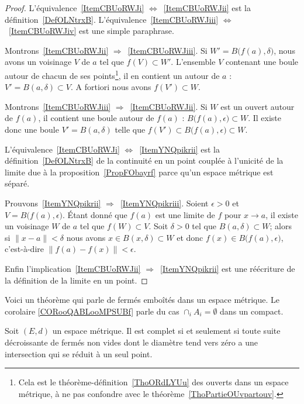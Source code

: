 \begin{proof}
	L'équivalence~\ref{ItemCBUoRWJi} \( \Leftrightarrow\)~\ref{ItemCBUoRWJii} est la définition~\ref{DefOLNtrxB}. L'équivalence~\ref{ItemCBUoRWJiii} \( \Leftrightarrow\)~\ref{ItemCBUoRWJiv} est une simple paraphrase.

	Montrons~\ref{ItemCBUoRWJii} \( \Rightarrow\)~\ref{ItemCBUoRWJiii}. Si \( W'=B\big( f(a),\delta \big)\), nous avons un voisinage \( V\) de \( a\) tel que \( f(V)\subset W'\). L'ensemble \( V\) contenant une boule autour de chacun de ses points\footnote{Cela est le théorème-définition~\ref{ThoORdLYUu} des ouverts dans un espace métrique, à ne pas confondre avec le théorème~\ref{ThoPartieOUvpartouv}.}, il en contient un autour de \( a\) : \( V'=B(a,\delta)\subset V\). A fortiori nous avons \( f(V')\subset W\).

	Montrons~\ref{ItemCBUoRWJiii} \( \Rightarrow\)~\ref{ItemCBUoRWJii}. Si \( W\) est un ouvert autour de \( f(a)\), il contient une boule autour de \( f(a)\) : \( B\big( f(a),\epsilon \big)\subset W\). Il existe donc une boule \( V'=B(a,\delta)\) telle que \( f(V')\subset B\big( f(a),\epsilon \big)\subset W\).

	L'équivalence~\ref{ItemCBUoRWJi} \( \Leftrightarrow\)~\ref{ItemYNQpikrii} est la définition~\ref{DefOLNtrxB} de la continuité en un point couplée à l'unicité de la limite due à la proposition~\ref{PropFObayrf} parce qu'un espace métrique est séparé.

	Prouvons~\ref{ItemYNQpikrii} \( \Rightarrow\)~\ref{ItemYNQpikriii}. Soient \( \epsilon>0\) et \( V=B\big( f(a),\epsilon \big)\). Étant donné que \( f(a)\) est une limite de \( f\) pour \( x\to a\), il existe un voisinage \( W\) de \( a\) tel que \( f(W)\subset V\). Soit \( \delta>0\) tel que \( B(a,\delta)\subset W\); alors si \( \| x-a \|<\delta\) nous avons \( x\in B(x,\delta)\subset W\) et donc \( f(x)\in B\big( f(a),\epsilon \big)\), c'est-à-dire \( \| f(a)-f(x) \|<\epsilon\).

	Enfin l'implication~\ref{ItemCBUoRWJii} \( \Rightarrow\)~\ref{ItemYNQpikrii} est une réécriture de la définition de la limite en un point.
\end{proof}

Voici un théorème qui parle de fermés emboîtés dans un espace métrique. Le corolaire \ref{CORooQABLooMPSUBf} parle du cas \( \cap_iA_i=\emptyset\) dans un compact.
\begin{theorem}   \label{ThoCQAcZxX}
	Soit \( (E,d)\) un espace métrique. Il est complet si et seulement si toute suite décroissante de fermés non vides dont le diamètre tend vers zéro a une intersection qui se réduit à un seul point.
\end{theorem}


